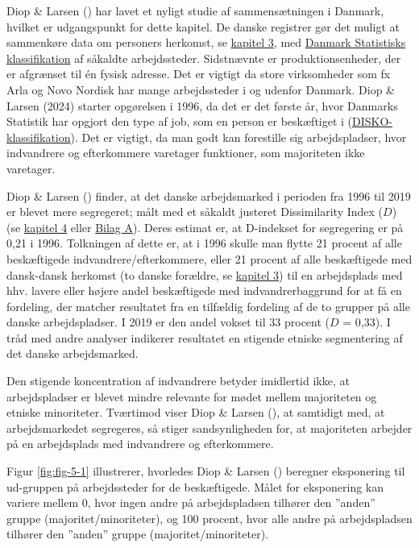 \documentclass[
]{book}
\begin{document}
Diop \& Larsen () har lavet et nyligt studie af sammensætningen i Danmark, hvilket er udgangspunkt for dette kapitel. De danske registrer gør det muligt at sammenkøre data om personers herkomst, se \hyperref[kap2]{kapitel 3}, med \href{https://www.dst.dk/Site/Dst/SingleFiles/GetArchiveFile.aspx?fi=659482655935&fo=0&ext=kvaldel}{Danmark Statistisks klassifikation} af såkaldte arbejdssteder. Sidstnævnte er produktionsenheder, der er afgrænset til én fysisk adresse. Det er vigtigt da store virksomheder som fx Arla og Novo Nordisk har mange arbejdssteder i og udenfor Danmark. Diop \& Larsen (2024) starter opgørelsen i 1996, da det er det første år, hvor Danmarks Statistik har opgjort den type af job, som en person er beskæftiget i (\href{https://www.dst.dk/Site/Dst/SingleFiles/GetArchiveFile.aspx?fi=2299282738&fo=0&ext=kvaldel}{DISKO-klassifikation}). Det er vigtigt, da man godt kan forestille sig arbejdspladser, hvor indvandrere og efterkommere varetager funktioner, som majoriteten ikke varetager.

Diop \& Larsen () finder, at det danske arbejdsmarked i perioden fra 1996 til 2019 er blevet mere segregeret; målt med et såkaldt justeret Dissimilarity Index (\(D\)) (se \hyperref[kap4]{kapitel 4} eller \hyperref[bilagA]{Bilag A}). Deres estimat er, at D-indekset for segregering er på 0,21 i 1996. Tolkningen af dette er, at i 1996 skulle man flytte 21 procent af alle beskæftigede indvandrere/efterkommere, eller 21 procent af alle beskæftigede med dansk-dansk herkomst (to danske forældre, se \hyperref[kap2]{kapitel 3}) til en arbejdsplads med hhv. lavere eller højere andel beskæftigede med indvandrerbaggrund for at få en fordeling, der matcher resultatet fra en tilfældig fordeling af de to grupper på alle danske arbejdspladser. I 2019 er den andel vokset til 33 procent (\(D\) = 0,33). I tråd med andre analyser indikerer resultatet en stigende etniske segmentering af det danske arbejdsmarked.

Den stigende koncentration af indvandrere betyder imidlertid ikke, at arbejdspladser er blevet mindre relevante for mødet mellem majoriteten og etniske minoriteter. Tværtimod viser Diop \& Larsen (), at samtidigt med, at arbejdsmarkedet segregeres, så stiger sandsynligheden for, at majoriteten arbejder på en arbejdsplads med indvandrere og efterkommere.

Figur \ref{fig:fig-5-1} illustrerer, hvorledes Diop \& Larsen () beregner eksponering til ud-gruppen på arbejdssteder for de beskæftigede. Målet for eksponering kan variere mellem 0, hvor ingen andre på arbejdspladsen tilhører den ''anden'' gruppe (majoritet/minoriteter), og 100 procent, hvor alle andre på arbejdspladsen tilhører den ''anden'' gruppe (majoritet/minoriteter).
\end{document}
